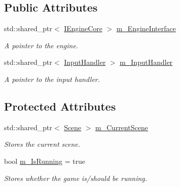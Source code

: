 \subsection*{Public Attributes}
\begin{DoxyCompactItemize}
\item 
\mbox{\label{class_game_a5597a65653eb1485429f8c8ceef9d502}} 
std\+::shared\+\_\+ptr$<$ \mbox{\hyperlink{class_i_engine_core}{I\+Engine\+Core}} $>$ \mbox{\hyperlink{class_game_a5597a65653eb1485429f8c8ceef9d502}{m\+\_\+\+Engine\+Interface}}
\begin{DoxyCompactList}\small\item\em A pointer to the engine. \end{DoxyCompactList}\item 
\mbox{\label{class_game_abaeacc32cd51f09cd25f279653b85f38}} 
std\+::shared\+\_\+ptr$<$ \mbox{\hyperlink{class_input_handler}{Input\+Handler}} $>$ \mbox{\hyperlink{class_game_abaeacc32cd51f09cd25f279653b85f38}{m\+\_\+\+Input\+Handler}}
\begin{DoxyCompactList}\small\item\em A pointer to the input handler. \end{DoxyCompactList}\end{DoxyCompactItemize}
\subsection*{Protected Attributes}
\begin{DoxyCompactItemize}
\item 
\mbox{\label{class_game_a4d44e28922d2ef362d86571546df28d1}} 
std\+::shared\+\_\+ptr$<$ \mbox{\hyperlink{class_scene}{Scene}} $>$ \mbox{\hyperlink{class_game_a4d44e28922d2ef362d86571546df28d1}{m\+\_\+\+Current\+Scene}}
\begin{DoxyCompactList}\small\item\em Stores the current scene. \end{DoxyCompactList}\item 
\mbox{\label{class_game_acd086a35b791b23b8c26f6f94546ce94}} 
bool \mbox{\hyperlink{class_game_acd086a35b791b23b8c26f6f94546ce94}{m\+\_\+\+Is\+Running}} = true
\begin{DoxyCompactList}\small\item\em Stores whether the game is/should be running. \end{DoxyCompactList}\end{DoxyCompactItemize}


